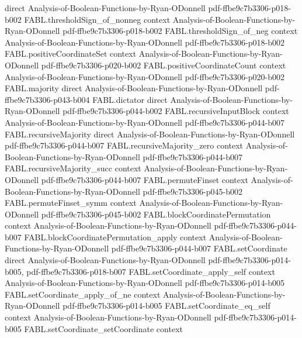 \begin{theorem}
  {direct}
  {Analysis-of-Boolean-Functions-by-Ryan-ODonnell}
  {pdf-ffbe9c7b3306-p018-b002}
\proofstep
  {FABL.thresholdSign_of_nonneg}
  {context}
  {Analysis-of-Boolean-Functions-by-Ryan-ODonnell}
  {pdf-ffbe9c7b3306-p018-b002}
\proofstep
  {FABL.thresholdSign_of_neg}
  {context}
  {Analysis-of-Boolean-Functions-by-Ryan-ODonnell}
  {pdf-ffbe9c7b3306-p018-b002}
\proofstep
  {FABL.positiveCoordinateSet}
  {context}
  {Analysis-of-Boolean-Functions-by-Ryan-ODonnell}
  {pdf-ffbe9c7b3306-p020-b002}
\proofstep
  {FABL.positiveCoordinateCount}
  {context}
  {Analysis-of-Boolean-Functions-by-Ryan-ODonnell}
  {pdf-ffbe9c7b3306-p020-b002}
\proofstep
  {FABL.majority}
  {direct}
  {Analysis-of-Boolean-Functions-by-Ryan-ODonnell}
  {pdf-ffbe9c7b3306-p043-b004}
\proofstep
  {FABL.dictator}
  {direct}
  {Analysis-of-Boolean-Functions-by-Ryan-ODonnell}
  {pdf-ffbe9c7b3306-p044-b002}
\proofstep
  {FABL.recursiveInputBlock}
  {context}
  {Analysis-of-Boolean-Functions-by-Ryan-ODonnell}
  {pdf-ffbe9c7b3306-p044-b007}
\proofstep
  {FABL.recursiveMajority}
  {direct}
  {Analysis-of-Boolean-Functions-by-Ryan-ODonnell}
  {pdf-ffbe9c7b3306-p044-b007}
\proofstep
  {FABL.recursiveMajority_zero}
  {context}
  {Analysis-of-Boolean-Functions-by-Ryan-ODonnell}
  {pdf-ffbe9c7b3306-p044-b007}
\proofstep
  {FABL.recursiveMajority_succ}
  {context}
  {Analysis-of-Boolean-Functions-by-Ryan-ODonnell}
  {pdf-ffbe9c7b3306-p044-b007}
\proofstep
  {FABL.permuteFinset}
  {context}
  {Analysis-of-Boolean-Functions-by-Ryan-ODonnell}
  {pdf-ffbe9c7b3306-p045-b002}
\proofstep
  {FABL.permuteFinset_symm}
  {context}
  {Analysis-of-Boolean-Functions-by-Ryan-ODonnell}
  {pdf-ffbe9c7b3306-p045-b002}
\proofstep
  {FABL.blockCoordinatePermutation}
  {context}
  {Analysis-of-Boolean-Functions-by-Ryan-ODonnell}
  {pdf-ffbe9c7b3306-p044-b007}
\proofstep
  {FABL.blockCoordinatePermutation_apply}
  {context}
  {Analysis-of-Boolean-Functions-by-Ryan-ODonnell}
  {pdf-ffbe9c7b3306-p044-b007}
\proofstep
  {FABL.setCoordinate}
  {direct}
  {Analysis-of-Boolean-Functions-by-Ryan-ODonnell}
  {pdf-ffbe9c7b3306-p014-b005,
    pdf-ffbe9c7b3306-p018-b007}
\proofstep
  {FABL.setCoordinate_apply_self}
  {context}
  {Analysis-of-Boolean-Functions-by-Ryan-ODonnell}
  {pdf-ffbe9c7b3306-p014-b005}
\proofstep
  {FABL.setCoordinate_apply_of_ne}
  {context}
  {Analysis-of-Boolean-Functions-by-Ryan-ODonnell}
  {pdf-ffbe9c7b3306-p014-b005}
\proofstep
  {FABL.setCoordinate_eq_self}
  {context}
  {Analysis-of-Boolean-Functions-by-Ryan-ODonnell}
  {pdf-ffbe9c7b3306-p014-b005}
\proofstep
  {FABL.setCoordinate_setCoordinate}
  {context}

\end{theorem}
